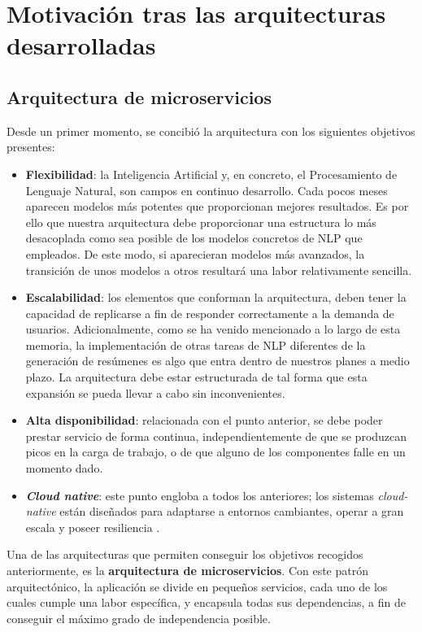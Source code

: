 \section{Motivación tras las arquitecturas desarrolladas}

\subsection{Arquitectura de microservicios}

Desde un primer momento, se concibió la arquitectura con los siguientes objetivos presentes:

\vspace{-0.5cm}
\begin{itemize}
	\item [\textbullet] \textbf{Flexibilidad}: la Inteligencia Artificial y, en concreto, el Procesamiento de Lenguaje Natural, son campos en continuo desarrollo. Cada pocos meses aparecen modelos más potentes que proporcionan mejores resultados. Es por ello que nuestra arquitectura debe proporcionar una estructura lo más desacoplada como sea posible de los modelos concretos de NLP que empleados. De este modo, si aparecieran modelos más avanzados, la transición de unos modelos a otros resultará una labor relativamente sencilla.
	\item [\textbullet] \textbf{Escalabilidad}: los elementos que conforman la arquitectura, deben tener la capacidad de replicarse a fin de responder correctamente a la demanda de usuarios. Adicionalmente, como se ha venido mencionado a lo largo de esta memoria, la implementación de otras tareas de NLP diferentes de la generación de resúmenes es algo que entra dentro de nuestros planes a medio plazo. La arquitectura debe estar estructurada de tal forma que esta expansión se pueda llevar a cabo sin inconvenientes. 
	\item [\textbullet] \textbf{Alta disponibilidad}: relacionada con el punto anterior, se debe poder prestar servicio de forma continua, independientemente de que se produzcan picos en la carga de trabajo, o de que alguno de los componentes falle en un momento dado.
	\item [\textbullet] \textbf{\emph{Cloud native}}: este punto engloba a todos los anteriores; los sistemas \emph{cloud-native} están diseñados para adaptarse a entornos cambiantes, operar a gran escala y poseer resiliencia \cite{cloud20}.
\end{itemize}

Una de las arquitecturas que permiten conseguir los objetivos recogidos anteriormente, es la \textbf{arquitectura de microservicios}. Con este patrón arquitectónico, la aplicación se divide en pequeños servicios, cada uno de los cuales cumple una labor específica, y encapsula todas sus dependencias, a fin de conseguir el máximo grado de independencia posible.

